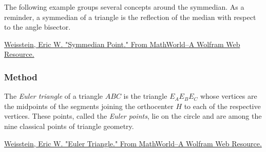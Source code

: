 The following example groups several concepts around the symmedian. As a reminder, a symmedian of a triangle is the reflection of the median with respect to the angle bisector.
\begin{flushright}
  \small
\href{https://mathworld.wolfram.com/SymmedianPoint.html}{Weisstein, Eric W. "Symmedian Point." From MathWorld--A Wolfram Web Resource.}
\end{flushright}

\vspace{1em}

\begin{minipage}{.5\textwidth}
\end{minipage}
\begin{minipage}{.5\textwidth}
\begin{tkzexample}
\end{tkzexample}
\end{minipage}

\subsubsection{Method }
\label{ssub:method_triangle_euler}

The \emph{Euler triangle} of a triangle $ABC$ is the triangle $E_AE_BE_C$ whose vertices are the midpoints of the segments joining the orthocenter $H$ to each of the respective vertices. These points, called the \emph{Euler points}, lie on the  circle and are among the nine classical points of triangle geometry.
\begin{flushright}
  \small
\href{https://mathworld.wolfram.com/EulerTriangle.html}{Weisstein, Eric W. "Euler Triangle." From MathWorld--A Wolfram Web Resource.}
\end{flushright}

